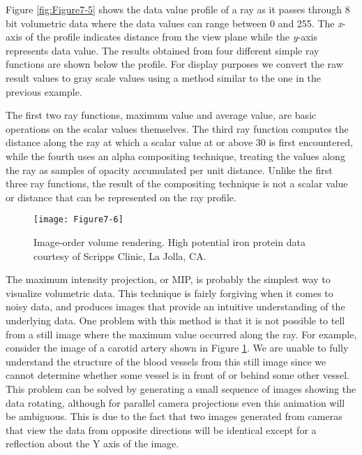 Figure \ref{fig:Figure7-5} shows the data value profile of a ray as it passes through 8 bit volumetric data where the data values can range between 0 and 255. The \emph{x}-axis of the profile indicates distance from the view plane while the \emph{y}-axis represents data value. The results obtained from four different simple ray functions are shown below the profile. For display purposes we convert the raw result values to gray scale values using a method similar to the one in the previous example.

The first two ray functions, maximum value and average value, are basic operations on the scalar values themselves. The third ray function computes the distance along the ray at which a scalar value at or above 30 is first encountered, while the fourth uses an alpha compositing technique, treating the values along the ray as samples of opacity accumulated per unit distance. Unlike the first three ray functions, the result of the compositing technique is not a scalar value or distance that can be represented on the ray profile.

\begin{figure}[!htb]
	\centering
	\texttt{[image: Figure7-6]}\\
	\caption{Image-order volume rendering. High potential iron protein data courtesy of Scripps Clinic, La Jolla, CA.}\label{fig:Figure7-6}
\end{figure}

The maximum intensity projection, or MIP, is probably the simplest way to visualize volumetric data. This technique is fairly forgiving when it comes to noisy data, and produces images that provide an intuitive understanding of the underlying data. One problem with this method is that it is not possible to tell from a still image where the maximum value occurred along the ray. For example, consider the image of a carotid artery shown in Figure \ref{fig:Figure7-6}. We are unable to fully understand the structure of the blood vessels from this still image since we cannot determine whether some vessel is in front of or behind some other vessel. This problem can be solved by generating a small sequence of images showing the data rotating, although for parallel camera projections even this animation will be ambiguous. This is due to the fact that two images generated from cameras that view the data from opposite directions will be identical except for a reflection about the Y axis of the image.

